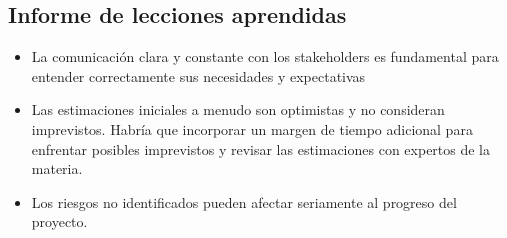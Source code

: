 \subsection{Informe de lecciones aprendidas}
\begin{itemize}
	\item La comunicación clara y constante con los stakeholders es fundamental para entender correctamente sus necesidades y expectativas
	\item Las estimaciones iniciales a menudo son optimistas y no consideran imprevistos. Habría que incorporar un margen de tiempo adicional para enfrentar posibles imprevistos y revisar las estimaciones con expertos de la materia.
	\item Los riesgos no identificados pueden afectar seriamente al progreso del proyecto.
\end{itemize}
